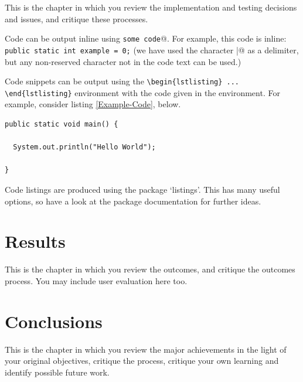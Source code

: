 \documentclass[12pt,a4paper]{report}
\begin{document}
This is the chapter in which you review the implementation and testing decisions and issues, and critique these processes.

Code can be output inline using \verb@\lstinline|some code|@.  For example, this code is inline: \lstinline|public static int example = 0;| (we have used the character \verb@|@ as a delimiter, but any non-reserved character not in the code text can be used.)

Code snippets can be output using the \verb|\begin{lstlisting} ... \end{lstlisting}|
environment with the code given in the environment. For example, consider listing \ref{Example-Code}, below.

\begin{lstlisting}[breaklines,breakatwhitespace,caption={Example code},label=Example-Code]
public static void main() {

  System.out.println("Hello World");

}
\end{lstlisting}

Code listings are produced using the package `listings'.  This has many useful options, so have a look at the package documentation for further ideas.

\chapter{Results}

This is the chapter in which you review the outcomes, and critique the outcomes process. You may include user evaluation here too.

\chapter{Conclusions}


This is the chapter in which you review the major achievements in the light of your original objectives, critique the process, critique your own learning and identify possible future work.
\end{document}
